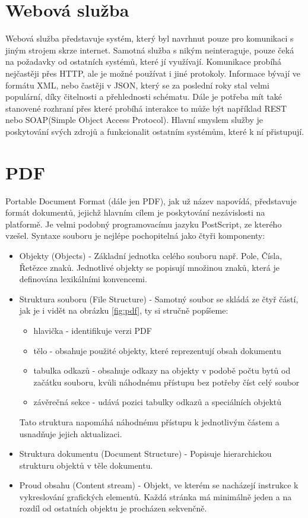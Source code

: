 \section{Webová služba}
 Webová služba\cite{webService} představuje systém, který byl navrhnut pouze pro komunikaci s jiným strojem skrze internet. Samotná služba s nikým neinteraguje, pouze čeká na požadavky od ostatních systémů, které jí využívají. Komunikace probíhá nejčastěji přes HTTP, ale je možné používat i jiné protokoly. Informace bývají ve formátu XML, nebo častěji v JSON, který se za poslední roky stal velmi populární, díky čitelnosti a přehlednosti schématu. Dále je potřeba mít také stanovené rozhraní přes které probíhá interakce to může být například REST nebo SOAP(Simple Object Access Protocol). Hlavní smyslem služby je poskytování svých zdrojů a funkcionalit ostatním systémům, které k ní přistupují. 

\section{PDF} \label{PDF}
	Portable Document Format (dále jen PDF), jak už název napovídá, představuje formát dokumentů, jejichž hlavním cílem je poskytování nezávislosti na platformě. Je velmi podobný programovacímu jazyku PostScript, ze kterého vzešel. Syntaxe souboru je nejlépe pochopitelná jako čtyři komponenty\cite{pdf}: 
	\begin{itemize}
		\item Objekty (Objects) - Základní jednotka celého souboru např. Pole, Čísla, Řetězce znaků. Jednotlivé objekty se popisují množinou znaků, která je definována lexikálními konvencemi.
		\item Struktura souboru (File Structure) - Samotný soubor se skládá ze čtyř částí, jak je i vidět na obrázku \ref{fig:pdf}, ty si stručně popíšeme: 
			\begin{itemize}
				\item hlavička - identifikuje verzi PDF
				\item tělo - obsahuje použité objekty, které reprezentují obsah dokumentu
				\item tabulka odkazů - obsahuje odkazy na objekty v podobě počtu bytů od začátku souboru, kvůli náhodnému přístupu bez potřeby číst celý soubor
				\item závěrečná sekce - udává pozici tabulky odkazů a speciálních objektů
			\end{itemize}
		Tato struktura napomáhá náhodnému přístupu k jednotlivým částem a usnadňuje jejich aktualizaci.
		\item Struktura dokumentu (Document Structure) - Popisuje hierarchickou strukturu objektů v těle dokumentu.
		\item Proud obsahu (Content stream) - Objekt, ve kterém se nacházejí instrukce k vykreslování grafických elementů. Každá stránka má minimálně jeden a na rozdíl od ostatních objektu je procházen sekvenčně.	
	\end{itemize}

